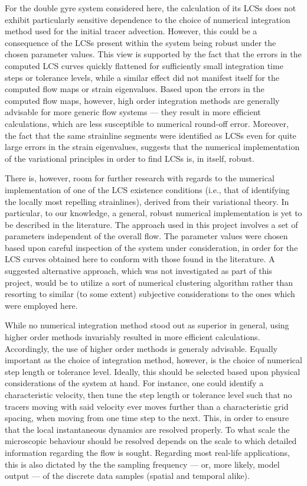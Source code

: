 For the double gyre system considered here, the calculation of its LCSs
does not exhibit particularly sensitive dependence to
the choice of numerical integration method used for the initial tracer
advection. However, this could be a consequence of the LCSs present within the
system being robust under the chosen parameter values. This view is supported by
the fact that the errors in the computed LCS curves quickly flattened for
sufficiently small integration time steps or tolerance levels, while a similar
effect did not manifest itself for the computed flow maps or strain eigenvalues.
Based upon the errors in the computed flow maps, however, high order integration
methods are generally advisable for more generic flow systems --- they result in
more efficient calculations, which are less susceptible to numerical round-off
error. Moreover, the fact that the same strainline segments were identified as
LCSs even for quite large errors in the strain eigenvalues, suggests that the
numerical implementation of the variational principles in order to find LCSs is,
in itself, robust.

There is, however, room for further research with regards to the numerical
implementation of one of the LCS existence conditions (i.e., that of identifying
the locally most repelling strainlines), derived from their variational theory.
In particular, to our knowledge, a general, robust numerical implementation is
yet to be described in the literature. The approach used in this project
involves a set of parameters independent of the overall flow. The parameter
values were chosen based upon careful inspection of the system under
consideration, in order for the LCS curves obtained here to conform with those
found in the literature. A suggested alternative approach, which was not
investigated as part of this project, would be to utilize a sort of numerical
clustering algorithm rather than resorting to similar (to some extent)
subjective considerations to the ones which were employed here.

While no numerical integration method stood out as superior in general,
using higher order methods invariably resulted in more efficient calculations.
Accordingly, the use of higher order methods is generaly advisable. Equally
important as the choice of integration method, however, is the choice of
numerical step length or tolerance level. Ideally, this should be selected based
upon physical considerations of the system at hand. For instance, one could
identify a characteristic velocity, then tune the step length or tolerance level
such that no tracers moving with said velocity ever moves further than a
characteristic grid spacing, when moving from one time step to the next. This,
in order to ensure that the local instantaneous dynamics are resolved properly.
To what scale the microscopic behaviour should be resolved depends on the scale
to which detailed information regarding the flow is sought. Regarding most
real-life applications, this is also dictated by the the sampling frequency ---
or, more likely, model output --- of the discrete data samples (spatial and
temporal alike).

